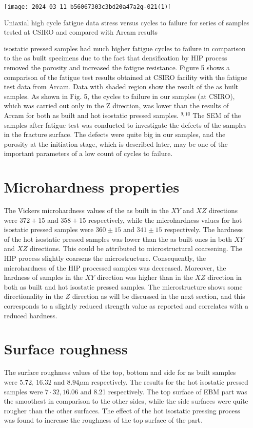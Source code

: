 \documentclass[10pt]{article}
\begin{document}
\begin{center}
\texttt{[image: 2024\_03\_11\_b56067303c3bd20a47a2g-021(1)]}
\end{center}

Uniaxial high cycle fatigue data stress versus cycles to failure for series of samples tested at CSIRO and compared with Arcam results

isostatic pressed samples had much higher fatigue cycles to failure in comparison to the as built specimens due to the fact that densification by HIP process removed the porosity and increased the fatigue resistance. Figure 5 shows a comparison of the fatigue test results obtained at CSIRO facility with the fatigue test data from Arcam. Data with shaded region show the result of the as built samples. As shown in Fig. 5, the cycles to failure in our samples (at CSIRO), which was carried out only in the Z direction, was lower than the results of Arcam for both as built and hot isostatic pressed samples. ${ }^{9,10}$ The SEM of the samples after fatigue test was conducted to investigate the defects of the samples in the fracture surface. The defects were quite big in our samples, and the porosity at the initiation stage, which is described later, may be one of the important parameters of a low count of cycles to failure.

\section*{Microhardness properties}
The Vickers microhardness values of the as built in the $X Y$ and $X Z$ directions were $372 \pm 15$ and $358 \pm 15$ respectively, while the microhardness values for hot isostatic pressed samples were $360 \pm 15$ and $341 \pm 15$ respectively. The hardness of the hot isostatic pressed samples was lower than the as built ones in both $X Y$ and $X Z$ directions. This could be attributed to microstructural coarsening. The HIP process slightly coarsens the microstructure. Consequently, the microhardness of the HIP processed samples was decreased. Moreover, the hardness of samples in the $X Y$ direction was higher than in the $X Z$ direction in both as built and hot isostatic pressed samples. The microstructure shows some directionality in the $Z$ direction as will be discussed in the next section, and this corresponds to a slightly reduced strength value as reported and correlates with a reduced hardness.

\section*{Surface roughness}
The surface roughness values of the top, bottom and side for as built samples were 5.72, 16.32 and $8.94 \mu \mathrm{m}$ respectively. The results for the hot isostatic pressed samples were $7 \cdot 32,16.06$ and 8.21 respectively. The top surface of EBM part was the smoothest in comparison to the other sides, while the side surfaces were quite rougher than the other surfaces. The effect of the hot isostatic pressing process was found to increase the roughness of the top surface of the part.
\end{document}
